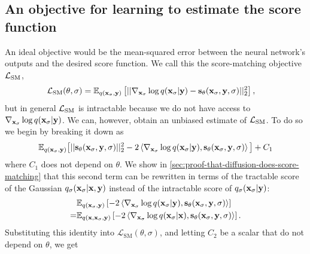 \subsection{An objective for learning to estimate the score function}
An ideal objective would be the mean-squared error between the neural network's outputs and the desired score function. We call this the score-matching objective ${\mathcal{L}}_\text{SM}$,
\begin{align}
    \mathcal{L}_\text{SM}(\theta, \sigma) &= \mathbb{E}_{q({\mathbf{x}}_\sigma, {\mathbf{y}})} \left[ || \nabla_{{\mathbf{x}}_\sigma} \log q({\mathbf{x}}_\sigma|{\mathbf{y}}) - {\mathbf{s}}_\theta({\mathbf{x}}_\sigma, {\mathbf{y}}, \sigma) ||_2^2 \right],
\end{align}
but in general ${\mathcal{L}}_\text{SM}$ is intractable because we do not have access to $\nabla_{{\mathbf{x}}_\sigma} \log q({\mathbf{x}}_\sigma|{\mathbf{y}})$. We can, however, obtain an unbiased estimate of ${\mathcal{L}}_\text{SM}$. To do so we begin by breaking it down as
\begin{align}
    \mathbb{E}_{q({\mathbf{x}}_\sigma, {\mathbf{y}})} \big[ 
    || {\mathbf{s}}_\theta({\mathbf{x}}_\sigma, {\mathbf{y}}, \sigma) ||_2^2
    - 2 \left\langle \nabla_{{\mathbf{x}}_\sigma} \log q({\mathbf{x}}_\sigma|{\mathbf{y}}),
    {\mathbf{s}}_\theta({\mathbf{x}}_\sigma, {\mathbf{y}}, \sigma) \right\rangle \big]
    + C_1
\end{align}
where $C_1$ does not depend on $\theta$. We show in \cref{sec:proof-that-diffusion-does-score-matching} that this second term can be rewritten in terms of the tractable score of the Gaussian $q_{\sigma}({\mathbf{x}}_\sigma|{\mathbf{x}},{\mathbf{y}})$ instead of the intractable score of $q_{\sigma}({\mathbf{x}}_\sigma|{\mathbf{y}})$:
\begin{align}
\allowdisplaybreaks
    &\EX_{q(\rvx_\sigma, \rvy)} \left[ - 2 \left\langle \nabla_{\rvx_\sigma} \log q(\rvx_\sigma|\rvy), \rvs_\theta(\rvx_\sigma, \rvy, \sigma) \right\rangle \right] \\
    =& \EX_{q(\rvx, \rvx_\sigma, \rvy)} \left[ -2 \left\langle \nabla_{\rvx_\sigma} \log q(\rvx_\sigma|\rvx), \rvs_\theta(\rvx_\sigma, \rvy, \sigma) \right\rangle  \right].
\end{align}
Substituting this identity into $\mathcal{L}_\text{SM}(\theta, \sigma)$, and letting $C_2$ be a scalar that do not depend on $\theta$, we get
